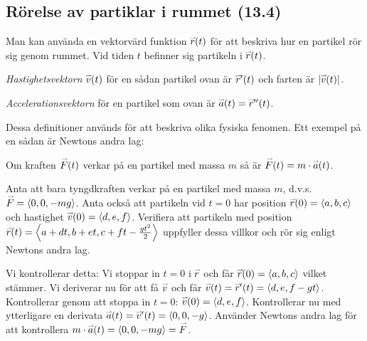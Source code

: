 \documentclass[a4paper]{article}
\begin{document}
\subsection{Rörelse av partiklar i rummet (13.4)}
Man kan använda en vektorvärd funktion \(
    \accentset{\rightharpoonup}{r} (t)
\) för att beskriva hur en partikel rör sig genom rummet. Vid tiden \(
    t
\) befinner sig partikeln i \(
    \accentset{\rightharpoonup}{r} (t)
\). 

\begin{defn}
    \emph{Hastighetsvektorn} \(
        \accentset{\rightharpoonup}{v} (t)
    \) för en sådan partikel ovan är \(
        \accentset{\rightharpoonup}{r} '(t)
    \) och farten är \(
        \abs{\accentset{\rightharpoonup}{v} (t)}
    \). 
\end{defn}

\begin{defn}[Accelerationsvektor]
    \emph{Accelerationsvektorn} för en partikel som ovan är \(
        \accentset{\rightharpoonup}{a} (t) = \accentset{\rightharpoonup}{r} ''(t)
    \).
\end{defn}

Dessa definitioner används för att beskriva olika fysiska fenomen. Ett exempel
på en sådan är Newtons andra lag:

\begin{sats}
    Om kraften \(
        \accentset{\rightharpoonup}{F} (t) 
    \) verkar på en partikel med massa \(
        m
    \) så är \(
        \accentset{\rightharpoonup}{F} (t) = m \cdot \accentset{\rightharpoonup}{a} (t)
    \).
\end{sats}

\begin{ex}
    Anta att bara tyngdkraften verkar på en partikel med massa \(
        m
    \), d.v.s.\ \(
        \accentset{\rightharpoonup}{F} = \left\langle 0, 0, -mg\right\rangle  
    \). Anta också att partikeln vid \(
        t = 0
    \) har position \(
        \accentset{\rightharpoonup}{r} (0) = \left\langle a,b,c\right\rangle
    \) och hastighet \(
        \accentset{\rightharpoonup}{v} (0) = \left\langle d, e, f\right\rangle
    \). Verifiera att partikeln med position \(
        \accentset{\rightharpoonup}{r}(t)  = \left\langle a+dt, b+et, c+ft-\frac{gt^2}{2}\right\rangle
    \) uppfyller dessa villkor och rör sig enligt Newtons andra lag.

    Vi kontrollerar detta: Vi stoppar in \(
        t = 0
    \) i \(
        \accentset{\rightharpoonup}{r} 
    \) och får \(
        \accentset{\rightharpoonup}{r} (0) = \left\langle a, b, c\right\rangle
    \) vilket stämmer. Vi deriverar nu för att få \(
        \accentset{\rightharpoonup}{v} 
    \) och får \(
        \accentset{\rightharpoonup}{v} (t) = \accentset{\rightharpoonup}{r} '(t) = \left\langle d, e, f-gt\right\rangle
    \). Kontrollerar genom att stoppa in \(
        t = 0
    \): \(
        \accentset{\rightharpoonup}{v} (0) = \left\langle d, e, f \right\rangle
    \). Kontrollerar nu med ytterligare en derivata \(
        \accentset{\rightharpoonup}{a} (t) = \accentset{\rightharpoonup}{v} '(t) = \left\langle 0, 0, -g\right\rangle
    \). Använder Newtons andra lag för att kontrollera \(
        m \cdot \accentset{\rightharpoonup}{a} (t) = \left\langle 0, 0, -mg\right\rangle = \accentset{\rightharpoonup}{F} 
    \).
\end{ex}



\end{document}
